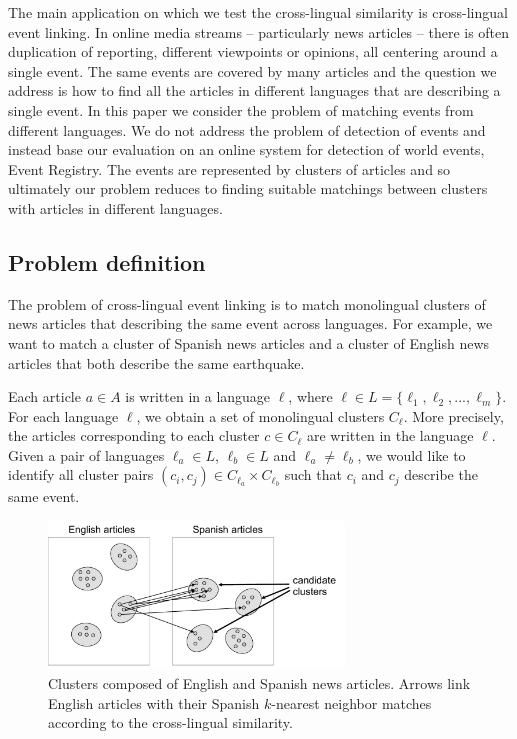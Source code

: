 \documentclass[twoside,11pt]{article}
\begin{document}
The main application on which we test the cross-lingual similarity is cross-lingual event linking. In online media streams -- particularly news articles -- there is often duplication of reporting, different viewpoints or opinions, all centering around a single event. The same events are covered by many articles and the question we address is how to find all the articles in different languages that are describing a single event. In this paper we consider the problem of matching events from different languages. We do not address the problem of detection of events and instead base our evaluation on an online system for detection of world events, Event Registry. The events are represented by clusters of articles and so ultimately our problem reduces to finding suitable matchings between clusters with articles in different languages.

\subsection{Problem definition}

The problem of cross-lingual event linking is to match monolingual clusters of news articles that describing the same event across languages. For example, we want to match a cluster of Spanish news articles and a cluster of English news articles that both describe the same earthquake.

Each article $a \in A$ is written in a language $\ell$, where $\ell \in L = \{\ell_1,\ell_2,...,\ell_m\}$. For each language $\ell$, we obtain a set of monolingual clusters $C_{\ell}$. More precisely, the articles corresponding to each cluster $c \in C_{\ell}$ are written in the language $\ell$. Given a pair of languages $\ell_a \in L$, $\ell_b \in L$ and $\ell_a \not= \ell_b$, we would like to identify all cluster pairs $(c_i, c_j) \in C_{\ell_a} \times C_{\ell_b}$ such that $c_i$ and $c_j$ describe the same event.

\begin{figure}[tb]
\centering
\includegraphics[width=0.7\textwidth]{clusters.pdf}
\caption{\label{fig:clusters}  Clusters composed of English and Spanish news articles. Arrows link English articles with their Spanish $k$-nearest neighbor matches according to the cross-lingual similarity.}
\end{figure}
\end{document}
